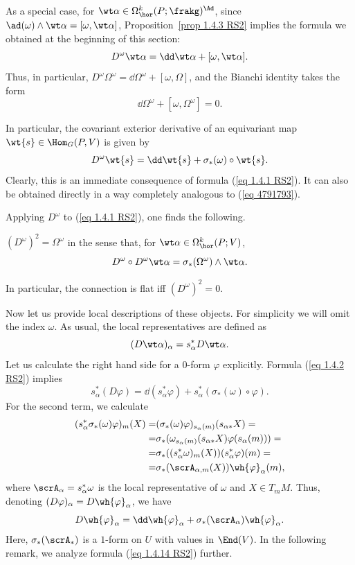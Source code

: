 \begin{rem}
    As a special case, for $\wt\alpha\in\Omega^k_{\hor}(P;\frakg)^\Ad$, since $\ad(\omega)\wedge\wt\alpha=[\omega,\wt\alpha]$, Proposition~\ref{prop 1.4.3 RS2} implies the formula we obtained at the beginning of this section:
    \[D^\omega\wt\alpha=\dd\wt\alpha+[\omega,\wt\alpha].\]
    Thus, in particular, $D^\omega\Omega^\omega=\dd\Omega^\omega+[\omega,\Omega]$, and the Bianchi identity takes the form
    \[\dd\Omega^\omega+[\omega,\Omega^\omega]=0.\label{eq 1.4.11 RS2 Bianchi}\]
\end{rem}


\begin{rem}\label{rem 1.4.4 RS2}
    In particular, the covariant exterior derivative of an equivariant map $\wt{s}\in\Hom_G(P,V)$ is given by
    \[D^\omega\wt{s}=\dd\wt{s}+\sigma_\ast(\omega)\circ \wt{s}.\label{eq 1.4.2 RS2}\]
    Clearly, this is an immediate consequence of formula (\ref{eq 1.4.1 RS2}). It can also be obtained directly in a way completely analogous to (\ref{eq 4791793}).
\end{rem}

Applying $D^\omega$ to (\ref{eq 1.4.1 RS2}), one finds the following.

\begin{prop}[{{\cite[Prop.~1.4.13]{RS2}}}] \label{prop 1.4.13 RS2}
    $(D^\omega)^2=\Omega^\omega$ in the sense that, for $\wt\alpha\in \Omega^k_{\hor}(P;V)$,
    \[D^\omega\circ D^\omega\wt\alpha=\sigma_\ast(\Omega^\omega)\wedge\wt\alpha.\]
\end{prop}
In particular, the connection is flat iff $(D^\omega)^2=0$.

Now let us provide local descriptions of these objects. For simplicity we will omit the index $\omega$. As usual, the local representatives are defined as
\[(D\wt\alpha)_\alpha=s_\alpha^\ast D\wt\alpha.\]
Let us calculate the right hand side for a $0$-form $\varphi$ explicitly. Formula (\ref{eq 1.4.2 RS2}) implies
\[s_\alpha^\ast(D\varphi)=\dd(s_\alpha^\ast\varphi)+s_\alpha^\ast(\sigma_\ast(\omega)\circ\varphi).\]
For the second term, we calculate
\begin{align}
    (s_\alpha^\ast\sigma_\ast(\omega)\varphi)_m(X)=&(\sigma_\ast(\omega)\varphi)_{s_\alpha(m)}(s_{\alpha\ast}X)=\\
    =&\sigma_\ast(\omega_{s_\alpha(m)}(s_{\alpha\ast}X)\varphi(s_\alpha(m)))=\\
    =&\sigma_\ast((s_\alpha^\ast\omega)_m(X))(s_\alpha^\ast\varphi)(m)=\\
    =&\sigma_\ast(\scrA_{\alpha,m}(X))\wh{\varphi}_\alpha(m),
\end{align}
where $\scrA_\alpha=s_\alpha^\ast\omega$ is the local representative of $\omega$ and $X\in T_mM$. Thus, denoting $(D\varphi)_\alpha=D\wh{\varphi}_\alpha$, we have
\[D\wh{\varphi}_\alpha=\dd\wh{\varphi}_\alpha+\sigma_\ast(\scrA_\alpha)\wh{\varphi}_\alpha.\label{eq 1.4.14 RS2}\]
Here, $\sigma_\ast(\scrA_\ast)$ is a $1$-form on $U$ with values in $\End(V)$. In the following remark, we analyze formula (\ref{eq 1.4.14 RS2}) further.

